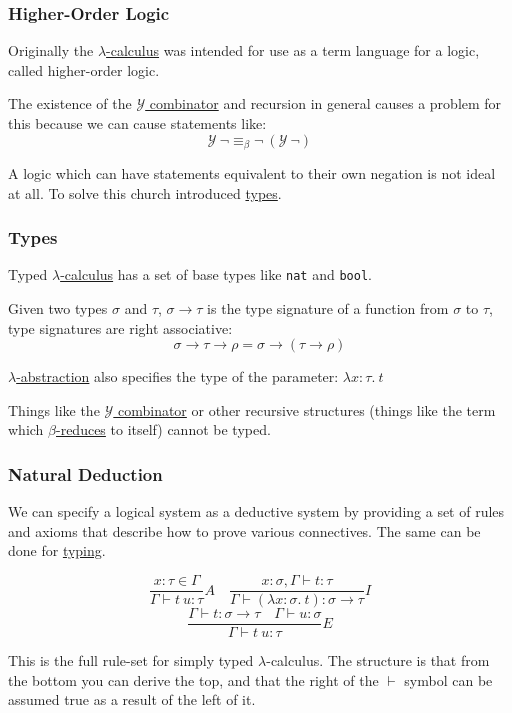 \documentclass{article}
\begin{document}
\subsubsection{Higher-Order Logic}
Originally the \hyperref[lambda-calculus]{$\lambda$-calculus} was intended for use as a term language for a logic, called higher-order logic.

The existence of the \hyperref[y-combinator]{$\mathcal{Y}$ combinator} and recursion in general causes a problem for this because we can cause statements like:
\[\mathcal{Y} \: \neg \equiv_\beta \neg \: (\mathcal{Y} \: \neg)\]

A logic which can have statements equivalent to their own negation is not ideal at all. To solve this church introduced \hyperref[types]{types}.

\subsubsection{Types}\label{types}
Typed \hyperref[lambda-calculus]{$\lambda$-calculus} has a set of base types like \texttt{nat} and \texttt{bool}.

Given two types $\sigma$ and $\tau$, $\sigma \to \tau$ is the type signature of a function from $\sigma$ to $\tau$, type signatures are right associative:
\[\sigma \to \tau \to \rho = \sigma \to (\tau \to \rho)\]

\hyperref[lambda-abstraction]{$\lambda$-abstraction} also specifies the type of the parameter: $\lambda x : \tau.\:t$

Things like the \hyperref[y-combinator]{$\mathcal{Y}$ combinator} or other recursive structures (things like the term which \hyperref[beta-reduction]{$\beta$-reduces} to itself) cannot be typed.


\subsubsection{Natural Deduction}
We can specify a logical system as a deductive system by providing a set of rules and axioms that describe how to prove various connectives. The same can be done for \hyperref[types]{typing}.

\[\frac{x : \tau \in \Gamma}{\Gamma \vdash t \: u : \tau}A \quad \frac{x : \sigma, \Gamma \vdash t : \tau}{\Gamma \vdash (\lambda x : \sigma.\:t) : \sigma \to \tau}I\]
\[\frac{\Gamma \vdash t : \sigma \to \tau \quad \Gamma \vdash u : \sigma}{\Gamma \vdash t \: u : \tau}E\]

This is the full rule-set for simply typed $\lambda$-calculus. The structure is that from the bottom you can derive the top, and that the right of the $\vdash$ symbol can be assumed true as a result of the left of it.
\end{document}
